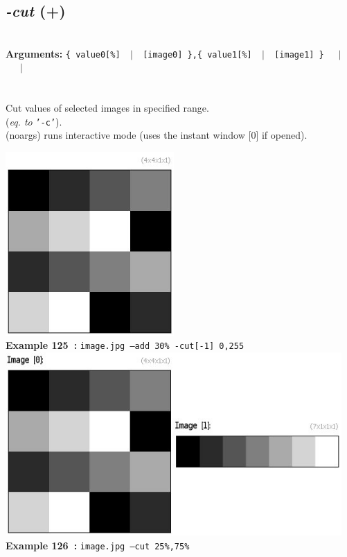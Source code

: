 \documentclass[a4paper,11pt,twoside]{book}
\begin{document}
\subsection{\emph{-cut} (+)}\vspace*{-0.5em}
~\\\textbf{Arguments: } 
{\small \texttt{\{ value0[\%] ~$|$~ [image0] \},\{ value1[\%] ~$|$~ [image1] \}}}~~~$|$\\
\hspace*{2.2cm}{\small \texttt{[image]}}~~~$|$\\
\\~\\
Cut values of selected images in specified range.
~\\(\emph{eq. to} {\small \texttt{'-c'}}).
~\\(noargs) runs interactive mode (uses the instant window [0] if opened).
\begin{center}\includegraphics[keepaspectratio=true,height=7cm,width=\textwidth]{img/gmic_def125.jpg}\\
{\footnotesize \textbf{Example 125~:} \texttt{image.jpg --add 30\% -cut[-1] 0,255}}
\\\includegraphics[keepaspectratio=true,height=7cm,width=\textwidth]{img/gmic_def126.jpg}\\
{\footnotesize \textbf{Example 126~:} \texttt{image.jpg --cut 25\%,75\%}}
\end{center}
\end{document}
